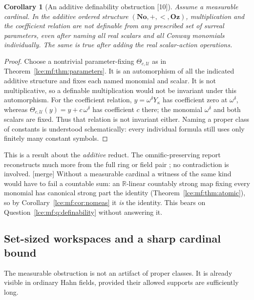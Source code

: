 \documentclass[11pt,letterpaper]{article}
\numberwithin{equation}{section}
\newtheorem{corollary}[theorem]{Corollary}
\theoremstyle{definition}
\theoremstyle{remark}
\newcommand{\No}{\mathbf{No}}
\newcommand{\Oz}{\mathbf{Oz}}
\newcommand{\R}{\mathbb R}
\newcommand{\thref}[1]{Theorem~\ref{#1}}
\newcommand{\src}[1]{\textup{\textsf{\small[#1]}}}%
\newcommand{\mergetag}{\textup{\textsf{\small[merge]}}}%
\begin{document}
\begin{corollary}[An additive definability obstruction \src{10}]\label{lce:mf:cor:definability}
Assume a measurable cardinal. In the additive ordered structure
$(\No,+,<,\Oz)$, multiplication and the coefficient relation are not
definable from any prescribed set of surreal parameters, even after naming
all real scalars and all Conway monomials individually. The same is true
after adding the real scalar-action operations.
\end{corollary}
\begin{proof}
Choose a nontrivial parameter-fixing $\Theta_{c,\mathcal U}$ as in
\thref{lce:mf:thm:parameters}. It is an automorphism of all the indicated
additive structure and fixes each named monomial and scalar. It is not
multiplicative, so a definable multiplication would not be invariant under
this automorphism. For the coefficient relation, $y=\omega^\delta Y_\kappa$
has coefficient zero at $\omega^\delta$, whereas
$\Theta_{c,\mathcal U}(y)=y+c\,\omega^\delta$ has coefficient $c$ there; the
monomial $\omega^\delta$ and both scalars are fixed. Thus that relation is
not invariant either. Naming a proper class of constants is understood
schematically: every individual formula still uses only finitely many
constant symbols.
\end{proof}

This is a result about the \emph{additive} reduct. The omnific-preserving
report reconstructs much more from the full ring or field pair
\cite{RepoOpa}; no contradiction is involved. \mergetag{} Without a
measurable cardinal a witness of the same kind would have to fail a
countable sum: an $\R$-linear countably strong map fixing every monomial has
canonical strong part the identity (\thref{lce:mf:thm:atomic}), so by
Corollary~\ref{lce:mf:cor:nomeas} it \emph{is} the identity. This bears on
Question~\ref{lce:mf:q:definability} without answering it.

\subsection{Set-sized workspaces and a sharp cardinal bound}
The measurable obstruction is not an artifact of proper classes. It is
already visible in ordinary Hahn fields, provided their allowed supports are
sufficiently long.
\end{document}
